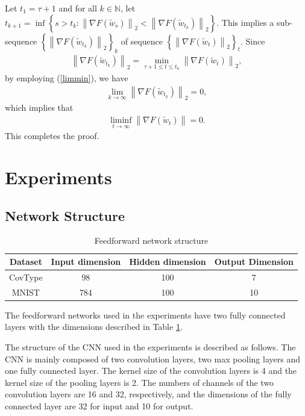 \documentclass[twoside]{article}
\begin{document}
Let $t_1 = \tau+1$ and for all $k\in\mathbb{N}$, let 
$
t_{k+1} = \inf \left\{s > t_{k}: \left\|\nabla F(\widetilde w_s) \right\|_2 < \left\|\nabla F(\widetilde w_{t_k})\right\|_2 \right\}.\nonumber
$
This implies a sub-sequence $\left\{\left\|\nabla F(\widetilde w_{t_k})\right\|_2\right\}_k$ of sequence $\left\{\left\|\nabla F(\widetilde w_{t})\right\|_2 \right\}_t$. Since
\begin{eqnarray}
\left\| \nabla F(\widetilde w_{t_k})\right\|_2 = \min_{\tau+1\leq t \leq t_k} \left\|\nabla F(\widetilde w_t)\right\|_2,\nonumber
\end{eqnarray}
by employing (\ref{limmin}), we have
\begin{eqnarray}
\lim_{k\to\infty}\left\| \nabla F(\widetilde w_{t_k})\right\|_2 = 0,\nonumber
\end{eqnarray}
which implies that 
\begin{eqnarray}
\liminf_{t\to\infty} \left\|\nabla F(\widetilde w_t)\right\| = 0.\nonumber
\end{eqnarray}
This completes the proof.
\section{Experiments}
\subsection{Network Structure}
\begin{table}[H]
    \centering
    \begin{tabular}{c|c|c|c}
    \hline
      Dataset   & Input dimension & Hidden dimension & Output Dimension\\\hline
        CovType & 98 & 100 & 7\\ 
        MNIST & 784 & 100 & 10\\ \hline
    \end{tabular}
    \caption{Feedforward network structure}
    \label{tab:FFNStructure}
\end{table}
The feedforward networks used in the experiments have two fully connected layers with the dimensions described in Table \ref{tab:FFNStructure}.

The structure of the CNN used in the experiments is described as follows. The CNN is mainly composed of two convolution layers, two max pooling layers and one fully connected layer. The kernel size of the convolution layers is 4 and the kernel size of the pooling layers is 2. The numbers of channels of the two convolution layers are 16 and 32, respectively, and the dimensions of the fully connected layer are 32 for input and 10 for output.
\end{document}
